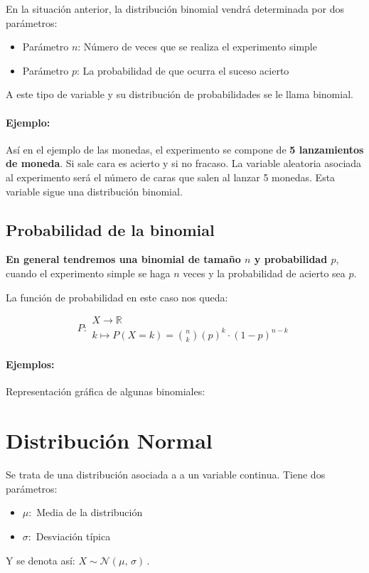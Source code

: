 En la situación anterior, la distribución binomial vendrá determinada por dos parámetros:
\begin{itemize}
\item Parámetro $n$: Número de veces que se realiza el experimento simple 
\item Parámetro $p$: La probabilidad de que ocurra el suceso acierto
\end{itemize}


A este tipo de variable y su distribución de probabilidades se le llama binomial. \\


\paragraph{Ejemplo:} Así en el ejemplo de las monedas, el experimento se compone de \textbf{5 lanzamientos de moneda}. Si sale cara es acierto y si no fracaso. La variable aleatoria asociada al experimento será el número de caras que salen al lanzar 5 monedas. Esta variable sigue una distribución binomial.

\subsection{Probabilidad de la binomial}\textbf{En general tendremos una binomial de tamaño $n$ y probabilidad $p$}, cuando el experimento simple se haga $n$ veces y la probabilidad de acierto sea $p$.

La función de probabilidad en este caso nos queda:
 
 $$P\colon \begin{array}{l} 
          X \rightarrow \mathbb{R} \\ 
          k\mapsto P(X=k)=\binom{n}{k}\left(p\right)^k\cdot  \left(1-p\right)^{n-k} 
         \end{array}$$
         
\paragraph{Ejemplos:} Representación gráfica de algunas binomiales:    
         

         
 

\section{Distribución Normal}
Se trata de una distribución asociada a a un variable continua. Tiene dos parámetros:
\begin{itemize}
    \item $\mu :$ Media de la distribución
    \item $\sigma :$ Desviación típica
\end{itemize}
Y se denota así: $
X \sim \mathcal{N}(\mu,\,\sigma)\,.
    $ 
    
